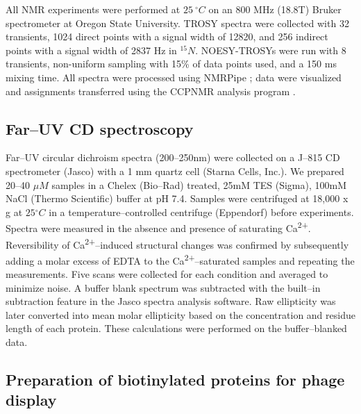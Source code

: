All NMR experiments were performed at $25\ ^{\circ}C$ on an 800 MHz
(18.8T) Bruker spectrometer at Oregon State University. TROSY spectra
were collected with 32 transients, 1024 direct points with a signal
width of 12820, and 256 indirect points with a signal width of 2837
Hz in $^{15}N$. NOESY-TROSYs were run with 8 transients, non-uniform
sampling with 15\% of data points used, and a 150 ms mixing time.
All spectra were processed using NMRPipe \citep{delaglio_nmrpipe:_1995};
data were visualized and assignments transferred using the CCPNMR
analysis program \citep{skinner_structure_2015}.

\subsection{Far--UV CD spectroscopy}

Far--UV circular dichroism spectra (200–250nm) were collected on a
J--815 CD spectrometer (Jasco) with a 1 mm quartz cell (Starna Cells,
Inc.). We prepared 20--40 $\mu M$ samples in a Chelex (Bio--Rad) treated,
25mM TES (Sigma), 100mM NaCl (Thermo Scientific) buffer at pH 7.4.
Samples were centrifuged at 18,000 x g at $25{^\circ}C$ in a temperature--controlled
centrifuge (Eppendorf) before experiments. Spectra were measured in
the absence and presence of saturating Ca\textsuperscript{2+}. Reversibility
of Ca\textsuperscript{2+}--induced structural changes was confirmed
by subsequently adding a molar excess of EDTA to the Ca\textsuperscript{2+}--saturated
samples and repeating the measurements. Five scans were collected
for each condition and averaged to minimize noise. A buffer blank
spectrum was subtracted with the built--in subtraction feature in the
Jasco spectra analysis software. Raw ellipticity was later converted
into mean molar ellipticity based on the concentration and residue
length of each protein. These calculations were performed on the buffer--blanked
data. 

\subsection{Preparation of biotinylated proteins for phage display}

